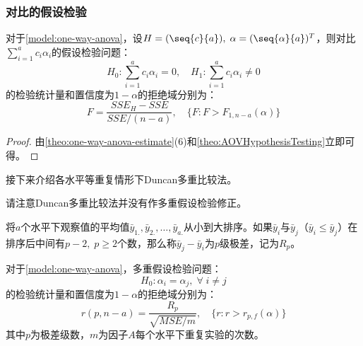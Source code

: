 \subsubsection{对比的假设检验}
\begin{theorem}
	对于\cref{model:one-way-anova}，设$H=(\seq{c}{a}),\;\alpha=(\seq{\alpha}{a})^T$，则对比$\sum\limits_{i=1}^{a}c_i\alpha_i$的假设检验问题：
	\begin{equation*}
		H_0:\sum_{i=1}^{a}c_i\alpha_i=0,\quad H_1:\sum_{i=1}^{a}c_i\alpha_i\ne0
	\end{equation*}
	的检验统计量和置信度为$1-\alpha$的拒绝域分别为：
	\begin{equation*}
		F=\frac{SSE_H-SSE}{SSE/(n-a)},\quad\{F:F>F_{1,n-a}(\alpha)\}
	\end{equation*}
\end{theorem}
\begin{proof}
	由\cref{theo:one-way-anova-estimate}(6)和\cref{theo:AOVHypothesisTesting}立即可得。
\end{proof}
接下来介绍各水平等重复情形下Duncan多重比较法。
\begin{note}
	请注意Duncan多重比较法并没有作多重假设检验修正。
\end{note}
\begin{definition}
	将$a$个水平下观察值的平均值$\bar{y}_{1.},\bar{y}_{2.},\dots,\bar{y}_{a.}$从小到大排序。如果$\bar{y}_i$与$\bar{y}_j$（$\bar{y}_i\leqslant\bar{y}_j$）在排序后中间有$p-2,\;p\geqslant2$个数，那么称$\bar{y}_j-\bar{y}_i$为$p$级极差，记为$R_p$。
\end{definition}
\begin{theorem}
	对于\cref{model:one-way-anova}，多重假设检验问题：
	\begin{equation*}
	H_0:\alpha_i=\alpha_j,\;\forall\;i\ne j
	\end{equation*}
	的检验统计量和置信度为$1-\alpha$的拒绝域分别为：
	\begin{equation*}
		r(p,n-a)=\frac{R_p}{\sqrt{MSE/m}},\quad\{r:r>r_{p,f}(\alpha)\}
	\end{equation*}
	其中$p$为极差级数，$m$为因子$A$每个水平下重复实验的次数。
\end{theorem}
